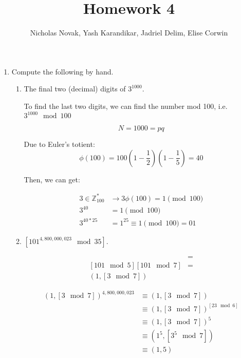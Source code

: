 \documentclass{article}
\title{Homework 4}
\date{}
\author{Nicholas Novak, Yash Karandikar, Jadriel Delim, Elise Corwin}
\begin{document}
\maketitle

\begin{enumerate}
  \item Compute the following by hand.
    \begin{enumerate}
      \item The final two (decimal) digits of $3^{1000}$.

        To find the last two digits, we can find the number mod 100, i.e.
        $3^{1000} \mod 100$

        \[
          N = 1000 = pq
        \]

        Due to Euler's totient:
        \[
          \phi(100) = 100\left(1 - \frac{1}{2}\right)\left(1 - \frac{1}{5}\right) = 40
        \]

        Then, we can get:

        \begin{align*}
          3 \in \mathbb{Z}^{*}_{100} &\to 3\phi(100) = 1 \pmod{100}\\
                3^{40} &= 1 \pmod{100}\\
          3^{40 * 25} &= 1^{25} \equiv 1 \pmod{100} = \boxed{01}
        \end{align*}

      \item $[101^{4,800,000,023} \mod 35]$.

        \begin{align*}
          [101^{4,800,000,023} \mod 35] &=\\
          [101 \mod 5][101 \mod 7] &=\\
          (1, [3 \mod 7])
        \end{align*}

        \begin{align*}
          (1, [3 \mod 7])^{4,800,000,023} &\equiv (1, [3 \mod 7])\\
                                          &\equiv (1, [3 \mod 7])^{[23 \mod
                                          6]}\\
                                          &\equiv (1, [3 \mod 7])^5\\
                                          &\equiv (1^5, [3^5 \mod 7])\\
                                          &\equiv (1, 5)
        \end{align*}


\end{enumerate}
\end{enumerate}
\end{document}
